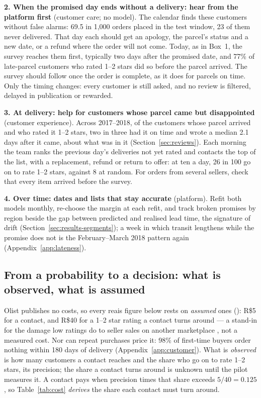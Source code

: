 \textbf{2. When the promised day ends without a delivery: hear from the platform
first} (customer care; no model). The calendar finds these customers without
false alarms: 69.5 in 1{,}000 orders placed in the test window, 23 of them never
delivered. That day each should get an apology, the parcel's status and a new
date, or a refund where the order will not come. Today, as in Box~1, the survey reaches them
first, typically two days after the promised date, and 77\% of late-parcel
customers who rated 1--2 stars did so before the parcel arrived. The survey
should follow once the order is complete, as it does for parcels on time. Only
the timing changes: every customer is still asked, and no review is filtered,
delayed in publication or rewarded.

\textbf{3. At delivery: help for customers whose parcel came but disappointed}
(customer experience). Across 2017--2018, of the customers whose parcel arrived
and who rated it 1--2 stars, two in three had it on time and wrote a median 2.1
days after it came, about what was in it (Section~\ref{sec:reviews}). Each morning the team
ranks the previous day's deliveries not yet rated and contacts the top of the
list, with a replacement, refund or return to offer: at ten a day, 26 in 100 go
on to rate 1--2 stars, against 8 at random. For orders from several sellers, check
that every item arrived before the survey.

\textbf{4. Over time: dates and lists that stay accurate} (platform). Refit both
models monthly, re-choose the margin at each refit, and track broken promises by
region beside the gap between predicted and realised lead time, the signature of
drift (Section~\ref{sec:results-segments}); a week in which transit lengthens
while the promise does not is the February--March 2018 pattern again
(Appendix~\ref{app:lateness}).

\subsection{From a probability to a decision: what is observed, what is assumed}
\label{sec:cost}

Olist publishes no costs, so every reais figure below rests on
\emph{assumed} ones (): R\$5 for a contact, and R\$40 for a
1--2 star rating a contact turns around --- a stand-in for the damage low ratings
do to seller sales on another marketplace \citep{deshpande2023logistics}, not a
measured cost. Nor can repeat purchases price it: 98\% of first-time
buyers order nothing within 180 days of delivery (Appendix~\ref{app:customer}). What is \emph{observed} is how many customers a
contact reaches and the share who go on to rate 1--2 stars, its precision; the
share a contact turns around is unknown until the pilot measures it. A contact
pays when precision times that share exceeds $5/40 = 0.125$
\citep{elkan2001cost}, so Table~\ref{tab:cost} \emph{derives} the share each
contact must turn around.


